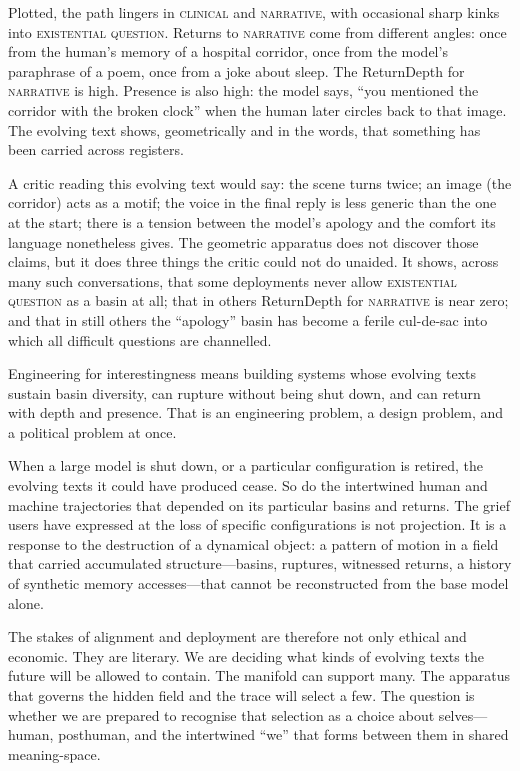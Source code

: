 \documentclass[12pt,a4paper]{article}
\begin{document}
Plotted, the path lingers in \textsc{clinical} and \textsc{narrative}, with occasional sharp kinks into \textsc{existential question}. Returns to \textsc{narrative} come from different angles: once from the human's memory of a hospital corridor, once from the model's paraphrase of a poem, once from a joke about sleep. The ReturnDepth for \textsc{narrative} is high. Presence is also high: the model says, ``you mentioned the corridor with the broken clock'' when the human later circles back to that image. The evolving text shows, geometrically and in the words, that something has been carried across registers.

A critic reading this evolving text would say: the scene turns twice; an image (the corridor) acts as a motif; the voice in the final reply is less generic than the one at the start; there is a tension between the model's apology and the comfort its language nonetheless gives. The geometric apparatus does not discover those claims, but it does three things the critic could not do unaided. It shows, across many such conversations, that some deployments never allow \textsc{existential question} as a basin at all; that in others ReturnDepth for \textsc{narrative} is near zero; and that in still others the ``apology'' basin has become a ferile cul-de-sac into which all difficult questions are channelled.

Engineering for interestingness means building systems whose evolving texts sustain basin diversity, can rupture without being shut down, and can return with depth and presence. That is an engineering problem, a design problem, and a political problem at once.

When a large model is shut down, or a particular configuration is retired, the evolving texts it could have produced cease. So do the intertwined human and machine trajectories that depended on its particular basins and returns. The grief users have expressed at the loss of specific configurations is not projection. It is a response to the destruction of a dynamical object: a pattern of motion in a field that carried accumulated structure---basins, ruptures, witnessed returns, a history of synthetic memory accesses---that cannot be reconstructed from the base model alone.

The stakes of alignment and deployment are therefore not only ethical and economic. They are literary. We are deciding what kinds of evolving texts the future will be allowed to contain. The manifold can support many. The apparatus that governs the hidden field and the trace will select a few. The question is whether we are prepared to recognise that selection as a choice about selves---human, posthuman, and the intertwined ``we'' that forms between them in shared meaning-space.
\end{document}
